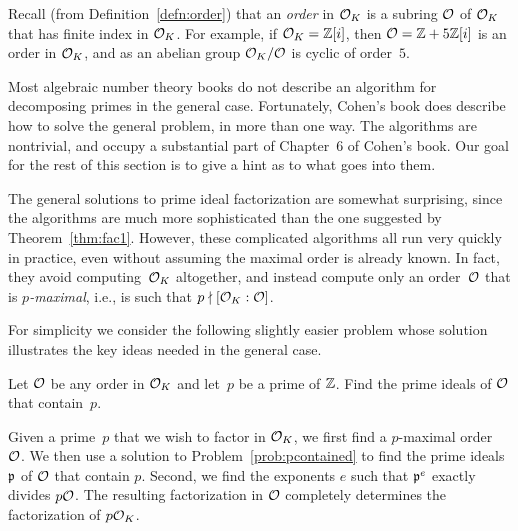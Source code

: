 Recall (from Definition~\ref{defn:order}) that an {\em order} in $\mathcal{O}_K$ is
a subring $\mathcal{O}$ of $\mathcal{O}_K$ that has finite index in $\mathcal{O}_K$.  For
example, if $\mathcal{O}_K=\mathbb{Z}[i]$, then $\mathcal{O}=\mathbb{Z} + 5\mathbb{Z}[i]$ is an order in $\mathcal{O}_K$,
and as an abelian group $\mathcal{O}_K/\mathcal{O}$ is cyclic of order~$5$.

Most algebraic number theory books do not describe an algorithm for
decomposing primes in the general case.  Fortunately, Cohen's book
\cite[Ch.~6]{cohen:course_ant} does describe how to solve the general
problem, in more than one way.  The algorithms are nontrivial, and
occupy a substantial part of Chapter~6 of Cohen's book.  Our goal
for the rest of this section is to give a hint as to what goes into them.

The general solutions to prime ideal factorization are somewhat surprising,
since the algorithms are much more sophisticated than the one
suggested by Theorem~\ref{thm:fac1}.  However, these complicated
algorithms all run very quickly in practice, even without assuming the
maximal order is already known.  In fact, they avoid computing~$\mathcal{O}_K$
altogether, and instead compute only an order~$\mathcal{O}$ that is {\em
  $p$-maximal}, i.e., is such that $p \nmid [\mathcal{O}_K:\mathcal{O}]$.

For simplicity we consider the following slightly easier problem whose
solution illustrates the key ideas needed in the general case.
\begin{problem}\label{prob:pcontained}
Let $\mathcal{O}$ be any order in $\mathcal{O}_K$
and let~$p$ be a prime of $\mathbb{Z}$.  Find the prime ideals of $\mathcal{O}$ that
contain~$p$.
\end{problem}

Given a prime~$p$
that we wish to factor in $\mathcal{O}_K$, we first find a $p$-maximal order~$\mathcal{O}$.
We then use a solution to Problem~\ref{prob:pcontained} to find
the prime ideals $\mathfrak{p}$ of $\mathcal{O}$ that contain $p$.  Second, we find
the exponents $e$ such that $\mathfrak{p}^e$ exactly divides $p\mathcal{O}$.
The resulting factorization in $\mathcal{O}$ completely determines
the factorization of $p\mathcal{O}_K$.

